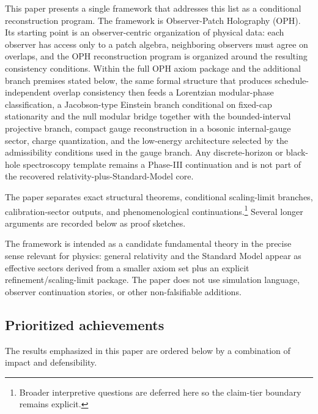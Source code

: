 \documentclass[11pt]{article}
\begin{document}
This paper presents a single framework that addresses this list as a conditional reconstruction program. The framework is Observer-Patch Holography (OPH). Its starting point is an observer-centric organization of physical data: each observer has access only to a patch algebra, neighboring observers must agree on overlaps, and the OPH reconstruction program is organized around the resulting consistency conditions. Within the full OPH axiom package and the additional branch premises stated below, the same formal structure that produces schedule-independent overlap consistency then feeds a Lorentzian modular-phase classification, a Jacobson-type Einstein branch conditional on fixed-cap stationarity and the null modular bridge together with the bounded-interval projective branch, compact gauge reconstruction in a bosonic internal-gauge sector, charge quantization, and the low-energy architecture selected by the admissibility conditions used in the gauge branch. Any discrete-horizon or black-hole spectroscopy template remains a Phase-III continuation and is not part of the recovered relativity-plus-Standard-Model core.

The paper separates exact structural theorems, conditional scaling-limit branches, calibration-sector outputs, and phenomenological continuations.\footnote{Broader interpretive questions are deferred here so the claim-tier boundary remains explicit.} Several longer arguments are recorded below as proof sketches.

The framework is intended as a candidate fundamental theory in the precise sense relevant for physics: general relativity and the Standard Model appear as effective sectors derived from a smaller axiom set plus an explicit refinement/scaling-limit package. The paper does not use simulation language, observer continuation stories, or other non-falsifiable additions.

\subsection*{Prioritized achievements}

The results emphasized in this paper are ordered below by a combination of impact and defensibility.
\end{document}
